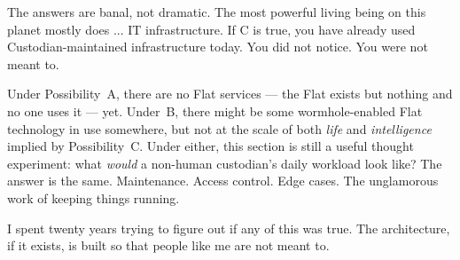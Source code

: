 The answers are banal, not dramatic. The most powerful living being on this planet mostly does ... IT infrastructure. If C is true, you have already used Custodian-maintained infrastructure today. You did not notice. You were not meant to.

Under Possibility~A, there are no Flat services --- the Flat exists but nothing and no one uses it --- yet. Under~B, there might be some wormhole-enabled Flat technology in use somewhere, but not at the scale of both \textit{life} and \textit{intelligence} implied by Possibility~C. Under either, this section is still a useful thought experiment: what \textit{would} a non-human custodian's daily workload look like? The answer is the same. Maintenance. Access control. Edge cases. The unglamorous work of keeping things running.

I spent twenty years trying to figure out if any of this was true. The architecture, if it exists, is built so that people like me are not meant to.